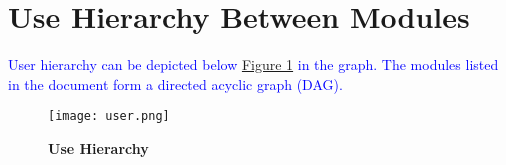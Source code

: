 \documentclass[12pt,letterpaper]{article}
\begin{document}
	\section{Use Hierarchy Between Modules} \label{SecUse}

\textcolor{blue}{User hierarchy can be depicted below \hyperref[FigUH]{Figure 1} in the graph. The modules listed in the document form a directed acyclic graph (DAG).} 

    \begin{figure}[H]
        \label{FigUH}
        \caption{\bf Use Hierarchy}
        \centering
        \bigskip
        \texttt{[image: user.png]}
    \end{figure}
\end{document}
